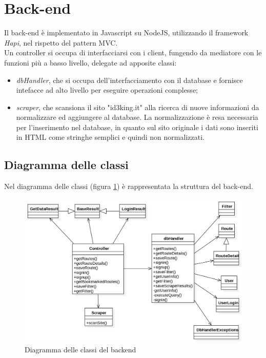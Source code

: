 \documentclass[11pt]{report}
\begin{document}
\section{Back-end}
Il back-end è implementato in Javascript su NodeJS, utilizzando il framework \textit{Hapi}, nel rispetto del pattern MVC.
\\Un controller si occupa di interfacciarsi con i client, fungendo da mediatore con le funzioni più a basso livello, delegate ad apposite classi:
\begin{itemize}
	\item \textit{dbHandler}, che si occupa dell'interfacciamento con il database e fornisce intefacce ad alto livello per eseguire operazioni complesse;
	\item \textit{scraper}, che scansiona il sito "id3king.it" alla ricerca di nuove informazioni da normalizzare ed aggiungere al database.
	La normalizzazione è resa necessaria per l'inserimento nel database, in quanto sul sito originale i dati sono inseriti in HTML come stringhe semplici e quindi non normalizzati.
\end{itemize}
\subsection{Diagramma delle classi}
Nel diagramma delle classi (figura \ref{class_diagram_backend}) è rappresentata la struttura del back-end.
\begin{figure}
	\centering
	\includegraphics[scale=0.45]{ClassDiagram_Backend}
	\caption{Diagramma delle classi del backend \label{class_diagram_backend}}
\end{figure}
\end{document}
